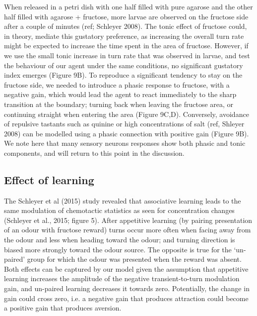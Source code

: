\documentclass[10pt,a4paper]{article}
\begin{document}
When released in a petri dish with one half filled with pure agarose and the other half filled with agarose + fructose, more larvae are observed on the fructose side after a couple of minutes (ref; Schleyer 2008). The tonic effect of fructose could, in theory, mediate this gustatory preference, as increasing the overall turn rate might be expected to increase the time spent in the area of fructose. However, if we use the small tonic increase in turn rate that was observed in larvae, and test the behaviour of our agent under the same conditions, no significant gustatory index emerges (Figure 9B).
 To reproduce a significant tendency to stay on the fructose side, we needed to introduce a phasic response to fructose, with a negative gain, which would lead the agent to react immediately to the sharp transition at the boundary; turning back when leaving the fructose area, or continuing straight when entering the area (Figure 9C,D).
  Conversely, avoidance of repulsive tastants such as quinine or high concentrations of salt (ref, Shleyer 2008) can be modelled using a phasic connection with positive gain (Figure 9B). We note here that many sensory neurons responses show both phasic and tonic components, and will return to this point in the discussion.

\subsection{Effect of learning}
The Schleyer et al (2015) study revealed that associative learning leads to the same modulation of chemotactic statistics as seen for concentration changes (Schleyer et al., 2015; figure 5). After appetitive learning (by pairing presentation of an odour with fructose reward) turns occur more often when facing away from the odour and less when heading toward the odour; and turning direction is biased more strongly toward the odour source. The opposite is true for the ‘un-paired’ group for which the odour was presented when the reward was absent. Both effects can be captured by our model given the assumption that appetitive learning increases the amplitude of the negative transient-to-turn modulation gain, and un-paired learning decreases it towards zero. Potentially, the change in gain could cross zero, i.e. a negative gain that produces attraction could become a positive gain that produces aversion. 
\end{document}
